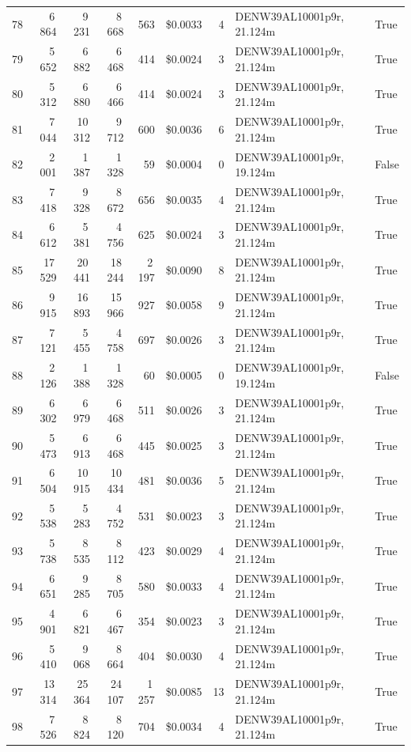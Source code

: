 \documentclass[a4paper,11pt]{article}
\begin{document}
\begin{table}[ht]
\begin{tabular}{r r r r r r r p{3cm} l}
78 & 6\,864 & 9\,231 & 8\,668 & 563 & \$0.0033 & 4 & DENW39AL10001p9r, 21.124m & True \\
79 & 5\,652 & 6\,882 & 6\,468 & 414 & \$0.0024 & 3 & DENW39AL10001p9r, 21.124m & True \\
80 & 5\,312 & 6\,880 & 6\,466 & 414 & \$0.0024 & 3 & DENW39AL10001p9r, 21.124m & True \\
81 & 7\,044 & 10\,312 & 9\,712 & 600 & \$0.0036 & 6 & DENW39AL10001p9r, 21.124m & True \\
82 & 2\,001 & 1\,387 & 1\,328 & 59 & \$0.0004 & 0 & DENW39AL10001p9r, 19.124m & False \\
83 & 7\,418 & 9\,328 & 8\,672 & 656 & \$0.0035 & 4 & DENW39AL10001p9r, 21.124m & True \\
84 & 6\,612 & 5\,381 & 4\,756 & 625 & \$0.0024 & 3 & DENW39AL10001p9r, 21.124m & True \\
85 & 17\,529 & 20\,441 & 18\,244 & 2\,197 & \$0.0090 & 8 & DENW39AL10001p9r, 21.124m & True \\
86 & 9\,915 & 16\,893 & 15\,966 & 927 & \$0.0058 & 9 & DENW39AL10001p9r, 21.124m & True \\
87 & 7\,121 & 5\,455 & 4\,758 & 697 & \$0.0026 & 3 & DENW39AL10001p9r, 21.124m & True \\
88 & 2\,126 & 1\,388 & 1\,328 & 60 & \$0.0005 & 0 & DENW39AL10001p9r, 19.124m & False \\
89 & 6\,302 & 6\,979 & 6\,468 & 511 & \$0.0026 & 3 & DENW39AL10001p9r, 21.124m & True \\
90 & 5\,473 & 6\,913 & 6\,468 & 445 & \$0.0025 & 3 & DENW39AL10001p9r, 21.124m & True \\
91 & 6\,504 & 10\,915 & 10\,434 & 481 & \$0.0036 & 5 & DENW39AL10001p9r, 21.124m & True \\
92 & 5\,538 & 5\,283 & 4\,752 & 531 & \$0.0023 & 3 & DENW39AL10001p9r, 21.124m & True \\
93 & 5\,738 & 8\,535 & 8\,112 & 423 & \$0.0029 & 4 & DENW39AL10001p9r, 21.124m & True \\
94 & 6\,651 & 9\,285 & 8\,705 & 580 & \$0.0033 & 4 & DENW39AL10001p9r, 21.124m & True \\
95 & 4\,901 & 6\,821 & 6\,467 & 354 & \$0.0023 & 3 & DENW39AL10001p9r, 21.124m & True \\
96 & 5\,410 & 9\,068 & 8\,664 & 404 & \$0.0030 & 4 & DENW39AL10001p9r, 21.124m & True \\
97 & 13\,314 & 25\,364 & 24\,107 & 1\,257 & \$0.0085 & 13 & DENW39AL10001p9r, 21.124m & True \\
98 & 7\,526 & 8\,824 & 8\,120 & 704 & \$0.0034 & 4 & DENW39AL10001p9r, 21.124m & True \\

\end{tabular}
\end{table}
\end{document}
